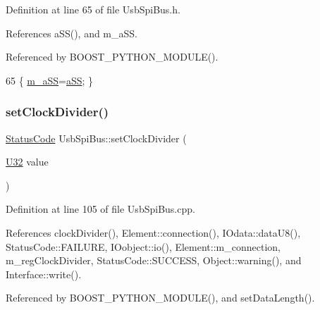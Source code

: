 Definition at line 65 of file Usb\+Spi\+Bus.\+h.



References a\+S\+S(), and m\+\_\+a\+SS.



Referenced by B\+O\+O\+S\+T\+\_\+\+P\+Y\+T\+H\+O\+N\+\_\+\+M\+O\+D\+U\+L\+E().


\begin{DoxyCode}
65 \{ \hyperlink{classUsbSpiBus_ac98d088ac8aed042f65cbd918fc538ae}{m\_aSS}=\hyperlink{classUsbSpiBus_afd9b0823f348dddc7fed8ae97d248e9c}{aSS}; \}
\end{DoxyCode}
\mbox{\label{classUsbSpiBus_a8cd3c808e7b72d8bc0f1d85a774e8c99}} 
\subsubsection{\texorpdfstring{set\+Clock\+Divider()}{setClockDivider()}}
{\footnotesize\ttfamily \hyperlink{classStatusCode}{Status\+Code} Usb\+Spi\+Bus\+::set\+Clock\+Divider (\begin{DoxyParamCaption}\item[{\hyperlink{classUsbSpiBus_a9b24e28662a35ca57f5ed32c41c5f3ff}{U32}}]{value }\end{DoxyParamCaption})}



Definition at line 105 of file Usb\+Spi\+Bus.\+cpp.



References clock\+Divider(), Element\+::connection(), I\+Odata\+::data\+U8(), Status\+Code\+::\+F\+A\+I\+L\+U\+RE, I\+Oobject\+::io(), Element\+::m\+\_\+connection, m\+\_\+reg\+Clock\+Divider, Status\+Code\+::\+S\+U\+C\+C\+E\+SS, Object\+::warning(), and Interface\+::write().



Referenced by B\+O\+O\+S\+T\+\_\+\+P\+Y\+T\+H\+O\+N\+\_\+\+M\+O\+D\+U\+L\+E(), and set\+Data\+Length().


